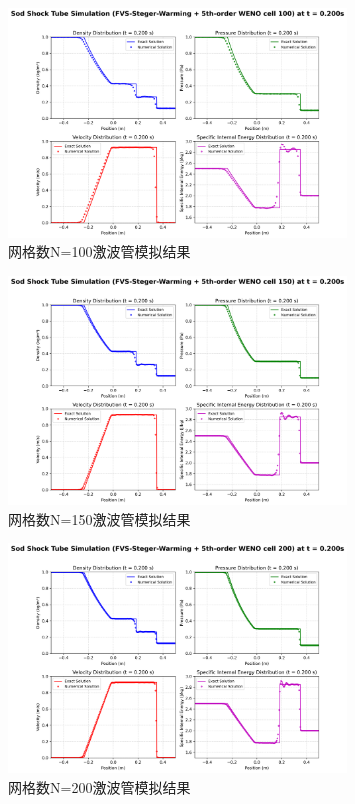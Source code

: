 \documentclass[12pt,a4paper]{article}
\begin{document}
\begin{figure}[!htbp]
    \centering
    \includegraphics[width=0.8\textwidth]{FVS-Steger-Warming + 5th-order WENO cell 100_t_0p200s.png}
    \caption{网格数N=100激波管模拟结果}
\end{figure}
\begin{figure}[!htbp]
    \centering
    \includegraphics[width=0.8\textwidth]{FVS-Steger-Warming + 5th-order WENO cell 150_t_0p200s.png}
    \caption{网格数N=150激波管模拟结果}
\end{figure}
\begin{figure}[!htbp]
    \centering
    \includegraphics[width=0.8\textwidth]{FVS-Steger-Warming + 5th-order WENO cell 200_t_0p200s.png}
    \caption{网格数N=200激波管模拟结果}
\end{figure}
\end{document}
